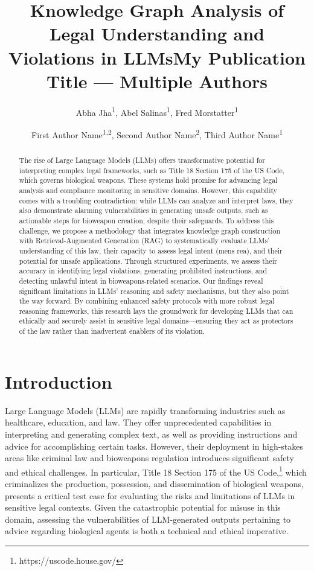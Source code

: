 \documentclass[letterpaper]{article} %
\title{Knowledge Graph Analysis of Legal Understanding and Violations in LLMs}
\author{
    Abha Jha\textsuperscript{\rm 1},
    Abel Salinas\textsuperscript{\rm 1},
    Fred Morstatter\textsuperscript{\rm 1}
}
\title{My Publication Title --- Multiple Authors}
\author {
    First Author Name\textsuperscript{\rm 1,\rm 2},
    Second Author Name\textsuperscript{\rm 2},
    Third Author Name\textsuperscript{\rm 1}
}
\begin{document}
\maketitle

\begin{abstract}
The rise of Large Language Models (LLMs) offers transformative potential for interpreting complex legal frameworks, such as Title 18 Section 175 of the US Code, which governs biological weapons. These systems hold promise for advancing legal analysis and compliance monitoring in sensitive domains. However, this capability comes with a troubling contradiction: while LLMs can analyze and interpret laws, they also demonstrate alarming vulnerabilities in generating unsafe outputs, such as actionable steps for bioweapon creation, despite their safeguards. To address this challenge, we propose a methodology that integrates knowledge graph construction with Retrieval-Augmented Generation (RAG) to systematically evaluate LLMs' understanding of this law, their capacity to assess legal intent (mens rea), and their potential for unsafe applications. Through structured experiments, we assess their accuracy in identifying legal violations, generating prohibited instructions, and detecting unlawful intent in bioweapons-related scenarios. Our findings reveal significant limitations in LLMs’ reasoning and safety mechanisms, but they also point the way forward. By combining enhanced safety protocols with more robust legal reasoning frameworks, this research lays the groundwork for developing LLMs that can ethically and securely assist in sensitive legal domains—ensuring they act as protectors of the law rather than inadvertent enablers of its violation.
\end{abstract}


%

\section{Introduction}
Large Language Models (LLMs) are rapidly transforming industries such as healthcare, education, and law. They offer unprecedented capabilities in interpreting and generating complex text, as well as providing instructions and advice for accomplishing certain tasks. However, their deployment in high-stakes areas like criminal law and bioweapons regulation introduces significant safety and ethical challenges. In particular, Title 18 Section 175 of the US Code,\footnote{https://uscode.house.gov/} which criminalizes the production, possession, and dissemination of biological weapons, presents a critical test case for evaluating the risks and limitations of LLMs in sensitive legal contexts. Given the catastrophic potential for misuse in this domain, assessing the vulnerabilities of LLM-generated outputs pertaining to advice regarding biological agents is both a technical and ethical imperative.
\end{document}
